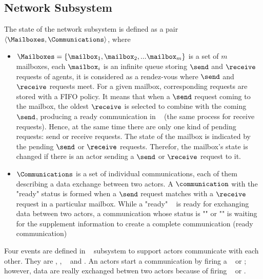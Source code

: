 \documentclass[a4paper,11pt]{article}
\begin{document}
\subsection{Network Subsystem}
The state of the network subsystem is defined as a pair $\langle \Mailboxes, \Communications \rangle$, where \begin{itemize}[noitemsep]
\setlength{\itemsep}{3pt}
\item $\Mailboxes = \{ \mailbox_1, \mailbox_2, ... \mailbox_m \}$ is a set of $m$ mailboxes, each $\mailbox_i$ is an infinite queue storing $\send$ and $\receive$ requests of agents, it is considered as a rendez-vous
where $\send$ and $\receive$ requests meet. For a given mailbox, corresponding requests are stored with a FIFO policy. It means that when a $\send$ request coming to the mailbox, the oldest $\receive$ is selected to combine with the coming $\send$, producing a ready communication in \Communications~ (the same process for receive requests). Hence, at the same time there are only one kind of pending requests: send or receive requests. The state of the mailbox is indicated by the pending $\send$ or $\receive$ requests. Therefor, the mailbox's state is changed if there is an actor sending a $\send$ or $\receive$ request to it. 
\item $\Communications$ is a set of individual communications, each of them describing a data exchange  between two actors.  A $\communication$ with the "ready" status is formed when a $\send$ request matches with a $\receive$ request in a particular mailbox. While a "ready" \communication~ is ready for exchanging data between two actors, a communication whose status is "\send" or "\receive" is waiting for the supplement information to create a complete communication (ready communication)
\end{itemize}
Four events are defined in \Network~ subsystem to support actors communicate with each other. They are \asynsend, \asynreceive, \wait~ and \test. An actors start a communication by firing a \asynsend~ or \asynreceive; however, data are really exchanged betwen two actors because of firing \wait~ or \test.
\end{document}

